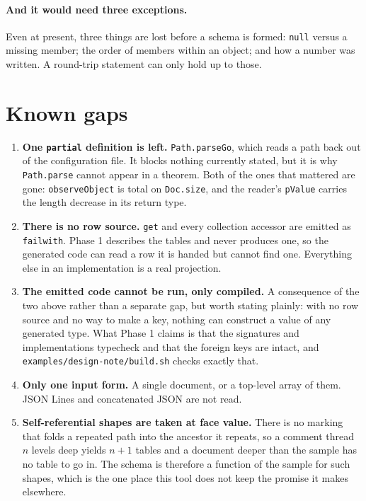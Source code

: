\documentclass[11pt,a4paper]{article}
\begin{document}
\paragraph{And it would need three exceptions.} Even at present, three things
are lost before a schema is formed: \texttt{null} versus a missing member;
the order of members within an object; and how a number was written. A
round-trip statement can only hold up to those.

\section{Known gaps}\label{sec:gaps}

\begin{enumerate}
  \item \textbf{One \texttt{partial} definition is left.}
        \texttt{Path.parseGo}, which reads a path back out of the
        configuration file. It blocks nothing currently stated, but it is why
        \texttt{Path.parse} cannot appear in a theorem. Both of the ones that
        mattered are gone: \texttt{observeObject} is total on
        \texttt{Doc.size}, and the reader's \texttt{pValue} carries the length
        decrease in its return type.
  \item \textbf{There is no row source.} \texttt{get} and every collection
        accessor are emitted as \texttt{failwith}. Phase 1 describes the
        tables and never produces one, so the generated code can read a row it
        is handed but cannot find one. Everything else in an implementation is
        a real projection.
  \item \textbf{The emitted code cannot be run, only compiled.} A consequence
        of the two above rather than a separate gap, but worth stating
        plainly: with no row source and no way to make a key, nothing can
        construct a value of any generated type. What Phase 1 claims is that
        the signatures and implementations typecheck and that the foreign keys
        are intact, and \texttt{examples/design-note/build.sh} checks exactly
        that.
  \item \textbf{Only one input form.} A single document, or a top-level array
        of them. JSON Lines and concatenated JSON are not read.
  \item \textbf{Self-referential shapes are taken at face value.} There is no
        marking that folds a repeated path into the ancestor it repeats, so a
        comment thread $n$ levels deep yields $n+1$ tables and a document
        deeper than the sample has no table to go in. The schema is therefore
        a function of the sample for such shapes, which is the one place this
        tool does not keep the promise it makes elsewhere.


\end{enumerate}
\end{document}
